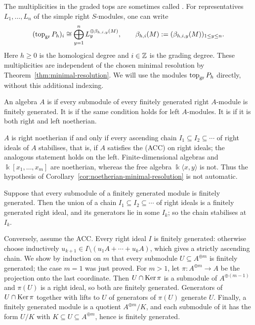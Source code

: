 \begin{advanced}
\begin{remark}\label{not:graded-betti}
The multiplicities in the graded tops are sometimes called .
For representatives $L_1,\ldots,L_n$ of the simple right $S$-modules, one can write
\[
(\operatorname{top}\nolimits_{\mathrm{gr}} P_h)_i\cong\bigoplus_{y=1}^nL_y^{\oplus\beta_{h,i,y}(M)},
\qquad
\beta_{h,i}(M):=(\beta_{h,i,y}(M))_{1\leq y\leq n}.
\]
Here $h\geq0$ is the homological degree and $i\in\mathbb{Z}$ is the grading degree.
These multiplicities are independent of the chosen minimal resolution by Theorem~\ref{thm:minimal-resolution}.
We will use the modules $\operatorname{top}\nolimits_{\mathrm{gr}} P_h$ directly, without this additional indexing.
\end{remark}
\end{advanced}

\begin{definition}\label{def:noetherian-algebra}
An algebra $A$ is  if every submodule of every finitely generated right $A$-module is finitely generated.
It is  if the same condition holds for left $A$-modules.
It is  if it is both right and left noetherian.
\end{definition}
\begin{remark}\label{rem:noetherian-acc}
$A$ is right noetherian if and only if every ascending chain $I_1\subseteq I_2\subseteq\cdots$ of right ideals of $A$ stabilises, that is, if $A$ satisfies the  (ACC) on right ideals; the analogous statement holds on the left.
Finite-dimensional algebras and $\Bbbk[x_1,\ldots,x_m]$ are noetherian, whereas the free algebra $\Bbbk\langle x,y\rangle$ is not.
Thus the hypothesis of Corollary~\ref{cor:noetherian-minimal-resolution} is not automatic.
\end{remark}

\begin{supplementary}
Suppose that every submodule of a finitely generated module is finitely generated.
Then the union of a chain $I_1\subseteq I_2\subseteq\cdots$ of right ideals is a finitely generated right ideal, and its generators lie in some $I_k$; so the chain stabilises at $I_k$.

Conversely, assume the ACC.
Every right ideal $I$ is finitely generated: otherwise choose inductively $u_{k+1}\in I\setminus(u_1A+\cdots+u_kA)$, which gives a strictly ascending chain.
We show by induction on $m$ that every submodule $U\subseteq A^{\oplus m}$ is finitely generated; the case $m=1$ was just proved.
For $m>1$, let $\pi:A^{\oplus m}\to A$ be the projection onto the last coordinate.
Then $U\cap\operatorname{Ker}\nolimits\pi$ is a submodule of $A^{\oplus(m-1)}$ and $\pi(U)$ is a right ideal, so both are finitely generated.
Generators of $U\cap\operatorname{Ker}\nolimits\pi$ together with lifts to $U$ of generators of $\pi(U)$ generate $U$.
Finally, a finitely generated module is a quotient $A^{\oplus m}/K$, and each submodule of it has the form $U/K$ with $K\subseteq U\subseteq A^{\oplus m}$, hence is finitely generated.
\end{supplementary}

